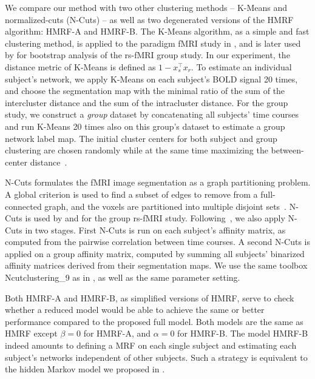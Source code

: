 \documentclass[review,authoryear]{elsarticle}
\begin{document}
We compare our method with two other clustering methods -- K-Means and
normalized-cuts (N-Cuts) -- as well as two degenerated versions of the HMRF
algorithm: HMRF-A and HMRF-B. The K-Means algorithm, as a simple and fast
clustering method, is applied to the paradigm fMRI study in
\citet{baumgartner1998quantification}, and is later used by
\cite{bellec2010multi} for bootstrap analysis of the rs-fMRI group study. In our
experiment, the distance metric of K-Means is defined as $1 - x_s^\intercal
x_r$.  To estimate an individual subject's network, we apply K-Means on each
subject's BOLD signal 20 times, and choose the segmentation map with the minimal
ratio of the sum of the intercluster distance and the sum of the intracluster
distance. For the group study, we construct a \emph{group} dataset by
concatenating all subjects' time courses and run K-Means 20 times also on this
group's dataset to estimate a group network label map. The initial cluster
centers for both subject and group clustering are chosen randomly while at the
same time maximizing the between-center distance~\citep{arthur2007k}.

N-Cuts  formulates the fMRI image segmentation as a graph partitioning problem. A
global criterion is used to find a subset of edges to remove from a
full-connected graph, and the voxels are partitioned into multiple disjoint
sets~\citep{shi2000normalized}.  N-Cuts is used by
\citet{van2008normalized} and \citet{craddock2012whole} for the group rs-fMRI
study. Following~\citeauthor{van2008normalized}, we also apply N-Cuts in two
stages. First N-Cuts is run on each subject's affinity matrix, as
computed from the pairwise correlation between time courses. A second N-Cuts is
applied on a group affinity matrix, computed by summing  all subjects'
binarized affinity matrices derived from their segmentation maps. We use the same
toolbox Ncutclustering\_9 \citep{shi2000normalized} as in
\citeauthor{van2008normalized}, as well as the same parameter setting.

Both HMRF-A and HMRF-B, as simplified versions of HMRF, serve to check whether a
reduced model would be able to achieve the same or better performance compared to
the proposed full model. Both models are the same as HMRF except $\beta = 0$ for
HMRF-A, and $\alpha = 0$ for HMRF-B. The model HMRF-B indeed amounts to defining a
MRF on each single subject and estimating each subject's networks independent of
other subjects. Such  a strategy is equivalent to the hidden Markov model we
proposed in \citet{liu2011monte}.
\end{document}
